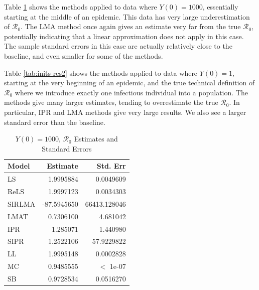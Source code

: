 \documentclass[12pt]{article}
\newcommand{\rr}{\ensuremath{\mathcal{R}_0}}
\begin{document}
  Table \ref{tab:inits-res1} shows the methods applied to data where $Y(0) = 1000$, essentially starting at the middle of an epidemic. This data has very large underestimation of $\rr$. The LMA method once again gives an estimate very far from the true $\rr$, potentially indicating that a linear approximation does not apply in this case. The sample standard errors in this case are actually relatively close to the baseline, and even smaller for some of the methods.

Table \ref{tab:inits-res2} shows the methods applied to data where $Y(0) = 1$, starting at the very beginning of an epidemic, and the true technical definition of $\rr$ where we introduce exactly one infectious individual into a population. The methods give many larger estimates, tending to overestimate the true $\rr$. In particular, IPR and LMA methods give very large results. We also see a larger standard error than the baseline.



\begin{table}[H]
	
	\centering
	\begin{tabular}[t]{l|r|r}
		\hline
		Model & Estimate & Std. Err\\
		\hline
		LS & 1.9995884 & 0.0049609\\
		\hline
		ReLS & 1.9997123 & 0.0034303\\
		\hline
		SIRLMA & -87.5945650 & 66413.128046\\
		\hline
		LMAT & 0.7306100 & 4.681042\\
		\hline
		IPR & 1.285071 & 1.440980\\
		\hline
		SIPR & 1.2522106 & 57.9229822 \\
		\hline
		LL & 1.9995148 & 0.0002828\\
		\hline
		MC & 0.9485555 & $<$ 1e-07\\
		\hline
		SB & 0.9728534 & 0.0516270\\
		\hline
	\end{tabular}
        \caption{$Y(0) = 1000$, $\rr$ Estimates and Standard Errors}\label{tab:inits-res1}
\end{table}
\end{document}
